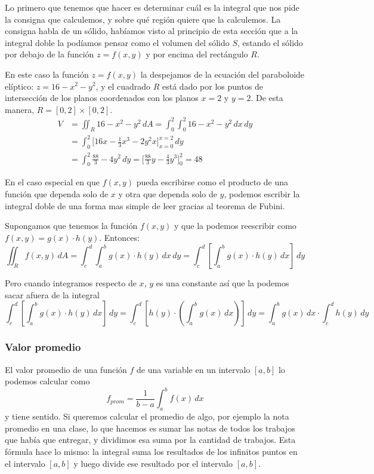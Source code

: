 \documentclass[12pt]{article}
\begin{document}
Lo primero que tenemos que hacer es determinar cuál es la integral que nos pide la consigna que calculemos, y sobre qué región quiere que la calculemos. La consigna habla de un sólido, habíamos visto al principio de esta sección que a la integral doble la podíamos pensar como el volumen del sólido $ S $, estando el sólido por debajo de la función $ z = f(x,y) $ y por encima del rectángulo $ R $.

En este caso la función $ z=f(x,y) $ la despejamos de la ecuación del paraboloide elíptico: $ z = 16-x^2-y^2 $, y el cuadrado $ R $ está dado por los puntos de intersección de los planos coordenados con los planos $ x=2 $ y $ y=2 $. De esta manera, $ R=\left[0,2\right]\times \left[0,2\right] $.
\begin{align*}
  V &= \iint_{R} 16-x^2-y^2 \,dA = \int_{0}^{2} \int_{0}^{2} 16-x^2-y^2 \,dx\,dy\\
   &= \int_{0}^{2} \Bigg[16x-\frac{1}{3}x^3-2y^2x\Bigg]_{x=0}^{x=2} \,dy\\
   &= \int_{0}^{2} \frac{88}{3}-4y^2 \,dy = \Bigg[\frac{88}{3}y-\frac{4}{3}y^3\Bigg]_{0}^{2}=48
\end{align*}

En el caso especial en que $ f(x,y) $ pueda escribirse como el producto de una función que dependa solo de $ x $ y otra que dependa solo de $ y $, podemos escribir la integral doble de una forma mas simple de leer gracias al teorema de Fubini.

Supongamos que tenemos la función $ f(x,y) $ y que la podemos reescribir como $ f(x,y)=g(x)\cdot h(y) $. Entonces:
\[
  \iint_{R} f(x,y) \,dA = \int_{c}^{d} \int_{a}^{b} g(x)\cdot h(y) \,dx\,dy = \int_{c}^{d} \left[\int_{a}^{b} g(x)\cdot h(y) \,dx\right] \,dy
\]

Pero cuando integramos respecto de $ x $, $ y $ es una constante así que la podemos sacar afuera de la integral
\[
  \int_{c}^{d} \left[\int_{a}^{b} g(x)\cdot h(y) \,dx\right] \,dy = \int_{c}^{d} \left[h(y)\cdot \left(\int_{a}^{b} g(x) \,dx\right)\right] \,dy = \int_{a}^{b} g(x) \,dx\cdot \int_{c}^{d} h(y) \,dy
\]

\subsubsection{Valor promedio}
El valor promedio de una función $ f $ de una variable en un intervalo $ \left[a,b\right] $ lo podemos calcular como
\[
  f_{prom}=\frac{1}{b-a}\int_{a}^{b} f(x) \,dx
\]
y tiene sentido. Si queremos calcular el promedio de algo, por ejemplo la nota promedio en una clase, lo que hacemos es sumar las notas de todos los trabajos que había que entregar, y dividimos esa suma por la cantidad de trabajos. Esta fórmula hace lo mismo: la integral suma los resultados de los infinitos puntos en el intervalo $ \left[a,b\right] $ y luego divide ese resultado por el intervalo $ \left[a,b\right] $.
\end{document}
